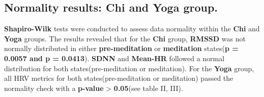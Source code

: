 \documentclass[
  11pt,
]{ieee}
\begin{document}
\subsection{Normality results: Chi and Yoga
group.}\label{normality-results-chi-and-yoga-group.}

\vspace{0.8em}

\begin{table}[!h]
\centering
\caption{Normality results for the Chi group}
\centering
{}
\end{table}

\textbf{Shapiro-Wilk} tests were conducted to assess data normality
within the \textbf{Chi} and \textbf{Yoga} groups. The results revealed
that for the \textbf{Chi} group, \textbf{RMSSD} was not normally
distributed in either \textbf{pre-meditation} or \textbf{meditation}
states(\textbf{p = 0.0057 and p = 0.0413}). \textbf{SDNN} and
\textbf{Mean-HR} followed a normal distribution for both
states(pre-meditation or meditation). For the \textbf{Yoga} group, all
HRV metrics for both states(pre-meditation or meditation) passed the
normality check with a \textbf{p-value} \textgreater{} \textbf{0.05}(see
table II, III).

\begin{table}[!h]
\centering
\caption{Normality results for the Yoga group}
\centering
{}
\end{table}
\end{document}
